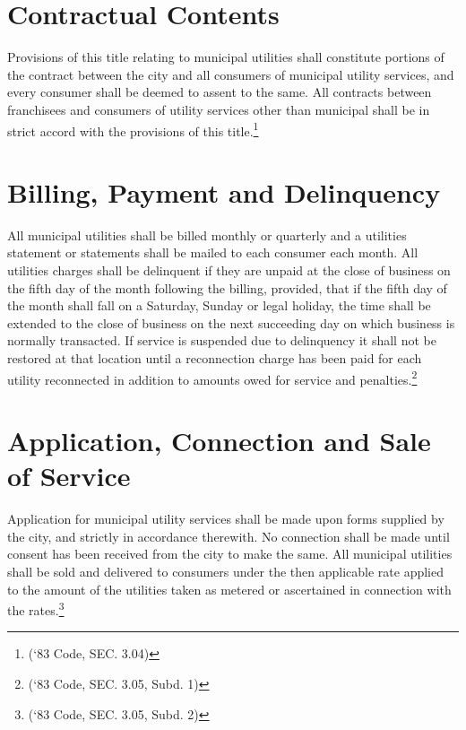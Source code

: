 \section{Contractual Contents}
Provisions of this title relating to municipal utilities shall constitute portions of the contract between the city and all consumers of municipal utility services, and every consumer shall be deemed to assent to the same.  All contracts between franchisees and consumers of utility services other than municipal shall be in strict accord with the provisions of this title.\footnote{(‘83 Code, SEC. 3.04)}\\

\setcounter{section}{14}
\section{Billing, Payment and Delinquency}
All municipal utilities shall be billed monthly or quarterly and a utilities statement or statements shall be mailed to each consumer each month.  All utilities charges shall be delinquent if they are unpaid at the close of business on the fifth day of the month following the billing, provided, that if the fifth day of the month shall fall on a Saturday, Sunday or legal holiday, the time shall be extended to the close of business on the next succeeding day on which business is normally transacted.  If service is suspended due to delinquency it shall not be restored at that location until a reconnection charge has been paid for each utility reconnected in addition to amounts owed for service and penalties.\footnote{(‘83 Code, SEC. 3.05, Subd. 1)}
\section{Application, Connection and Sale of Service}
Application for municipal utility services shall be made upon forms supplied by the city, and strictly in accordance therewith.  No connection shall be made until consent has been received from the city to make the same.  All municipal utilities shall be sold and delivered to consumers under the then applicable rate applied to the amount of the utilities taken as metered or ascertained in connection with the rates.\footnote{(‘83 Code, SEC. 3.05, Subd. 2)}

